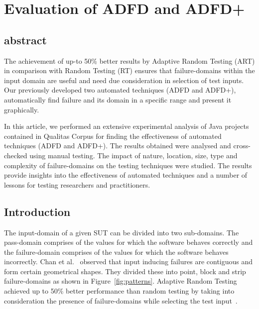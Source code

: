 
\chapter{Evaluation of ADFD and ADFD+}
\label{chap:futureWork}
	


\section{abstract}
The achievement of up-to 50\% better results by Adaptive Random Testing (ART) in comparison with Random Testing (RT) ensures that failure-domains within the input domain are useful and need due consideration in selection of test inputs. Our previously developed two automated techniques (ADFD and ADFD+), automatically find failure and its domain in a specific range and present it graphically.

In this article, we performed an extensive experimental analysis of Java projects contained in Qualitas Corpus for finding the effectiveness of automated techniques (ADFD and ADFD+). The results obtained were analysed and cross-checked using manual testing. The impact of nature, location, size, type and complexity of failure-domains on the testing techniques were studied. The results provide insights into the effectiveness of automated techniques and a number of lessons for testing researchers and practitioners.






\section{Introduction}
The input-domain of a given SUT can be divided into two sub-domains. The pass-domain comprises of the values for which the software behaves correctly and the failure-domain comprises of the values for which the software behaves incorrectly. Chan et al.~\cite{chan1996proportional} observed that input inducing failures are contiguous and form certain geometrical shapes. They divided these into point, block and strip failure-domains as shown in Figure~\ref{fig:patterns}. Adaptive Random Testing achieved up to 50\% better performance than random testing by taking into consideration the presence of failure-domains while selecting the test input~\cite{Chen2008}.

